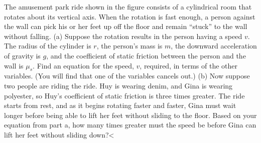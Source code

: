 The amusement park ride shown in the figure consists
of a cylindrical room that rotates about its vertical axis.
When the rotation is fast enough, a person against the wall
can pick his or her feet up off the floor and remain
``stuck'' to the wall without falling.\hwendpart
(a) Suppose the rotation results in the person having a
speed $v$. The radius of the cylinder is $r$, the person's
mass is $m$, the downward acceleration of gravity is $g$,
and the coefficient of static friction between the person
and the wall is $\mu_s$.  Find an equation for the speed,
$v$, required, in terms of the other variables.  (You will
find that one of the variables cancels out.)\hwendpart
(b) Now suppose two people are riding the ride.  Huy is
wearing denim, and Gina is wearing polyester, so Huy's
coefficient of static friction is three times greater.  The
ride starts from rest, and as it begins rotating faster and
faster, Gina must wait longer before being able to lift her
feet without sliding to the floor.  Based on your equation
from part a, how many times greater must the speed be before
Gina can lift her feet without sliding down?<%
